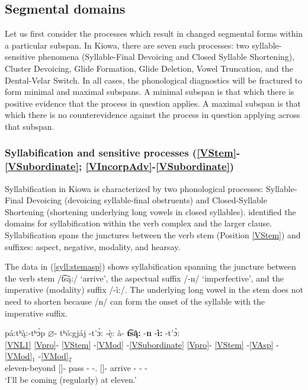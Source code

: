 \documentclass[output=paper]{langscibook}
\begin{document}
\subsection{Segmental domains} \label{sec:segmental}

Let us first consider the processes which result in changed segmental forms within a particular subspan. In Kiowa, there are seven such processes: two syl\-lab\-le-sensitive phenomena (Syllable-Final Devoicing and Closed Syllable Shortening), Cluster Devoicing, Glide Formation, Glide Deletion, Vowel Truncation, and the Dental-Velar Switch. In all cases, the phonological diagnostics will be fractured to form minimal and maximal subspans. A minimal subspan is that which there is positive evidence that the process in question applies. A maximal subspan is that which there is no counterevidence against the process in question applying across that subspan.

\subsubsection{Syllabification and sensitive processes (\ref{VStem}-\ref{VSubordinate}; \ref{VIncorpAdv}-\ref{VSubordinate})} \label{sec:syllab}

Syllabification in Kiowa is characterized by two phonological processes: Syllable-Final Devoicing (devoicing syllable-final obstruents) and Closed-Syllable Shortening (shortening underlying long vowels in closed syllables). \citet{Miller:2018} identified the domains for syllabification within the verb complex and the larger clause. Syllabification spans the junctures between the verb stem (Position \ref{VStem}) and suffixes: aspect, negative, modality, and hearsay.

The data in (\ref{syll:stemasp}) shows syllabification spanning the juncture between the verb stem /t͡s\k{â}:/ `arrive', the aspectual suffix /-n/ `imperfective', and the imperative (modality) suffix /-\`i:/. The underlying long vowel in the stem does not need to shorten because /n/ can form the onset of the syllable with the imperative suffix.

\ea \label{syll:stemasp}
\glll pá:tʰ\k{\`a}:-tʰ\`{ɔ}p $\varnothing$- tʰó:gjáj -t'\`{ɔ}: -\k{è}: \`a- \textbf{t͡s\k{â}:} -\textbf{n} -\textbf{\`i:} -t'\`{ɔ}:\\
\ref{VNL1} {\ref{Vpro}}- \ref{VStem} -\ref{VMod} -\ref{VSubordinate} {\ref{Vpro}}- \ref{VStem} -\ref{VAsp} -\ref{VMod}$_{1}$ -\ref{VMod}$_{2}$\\
eleven-beyond [\Third\Sg]- pass -{\Fut} -{\When.\Diff} [\First\Sg]- arrive -{\Ipfv} -{\Imp} -{\Fut}\\
\trans `I'll be coming (regularly) at eleven.' \citep[][173]{Watkins:1984}%
\z 
\end{document}
